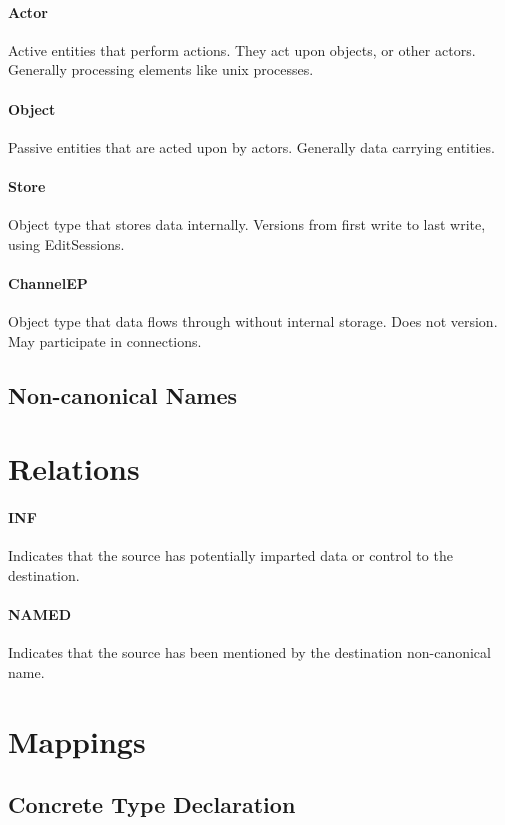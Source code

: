 \documentclass[12pt,twoside,openright,a4paper]{article}
\begin{document}
\paragraph{Actor}
Active entities that perform actions. They act upon objects, or other actors. Generally processing elements like unix processes.

\paragraph{Object}
Passive entities that are acted upon by actors. Generally data carrying entities.

\paragraph{Store}
Object type that stores data internally. Versions from first write to last write, using EditSessions.

\paragraph{ChannelEP}
Object type that data flows through without internal storage. Does not version. May participate in connections.

\subsection{Non-canonical Names}

\section{Relations}

\paragraph{INF}
Indicates that the source has potentially imparted data or control to the destination.

\paragraph{NAMED}
Indicates that the source has been mentioned by the destination non-canonical name.

\section{Mappings}

\subsection{Concrete Type Declaration}
\end{document}
